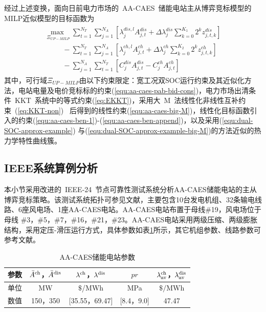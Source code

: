 经过上述变换，面向日前电力市场的~AA-CAES~储能电站主从博弈竞标模型的MILP近似模型的目标函数为
\begin{eqnarray}
\begin{array}{l}
\mathop {\max \;}\limits_{\Xi_{UP-MILP}} \sum\limits_{t = 1}^{{N_T}} {\sum\limits_{j = 1}^{{N_A}} {[{\lambda _j^{dis,l}A_{j,t}^{dis} + \Delta \lambda _j^{dis}\sum\limits_{k = 0}^{{K_1}} {{2^k}} z_{j,t,k}^{dis}}]} } \\
\;\;\;\;\;\;\;\;\; - \sum\limits_{t = 1}^{{N_T}} {\sum\limits_{j = 1}^{{N_A}} {[{\lambda _j^{ch,l}A_{j,t}^{ch} + \Delta \lambda _j^{ch}\sum\limits_{k = 0}^{{K_2}} {{2^k}} z_{j,t,k}^{ch}}]} } \\
\;\;\;\;\;\;\;\;\; - \sum\limits_{j = 1}^{{N_A}} {\sum\limits_{t = 1}^{{N_T}} {[{C_j^{dis}A_{j,t}^{dis} - C_j^{ch}A_{j,t}^{ch}}]} }
\end{array}
\end{eqnarray}
其中，可行域$\Xi_{UP-MILP}$由以下约束限定：宽工况双SOC运行约束及其近似化方法，电站电量及电价竞标标的约束(\ref{equ:aa-caes-pab-bid-cons})，电力市场出清条件~KKT~系统中的等式约束(\ref{eq:EKKT})，采用大~M~法线性化非线性互补约束~(\ref{eq:KKT-non})~ 后得到的线性约束(\ref{equ:aa-caes-big-M})，线性化目标函数引入的约束(\ref{equ:aa-caes-ben-1})-(\ref{equ:aa-caes-ben-append})，以及采用(\ref{equ:dual-SOC-approx-example}) 与(\ref{equ:dual-SOC-approx-example-big-M})的方法近似的热力学特性曲线簇。

\subsection{IEEE系统算例分析}
本小节采用改进的~IEEE-24~节点可靠性测试系统分析AA-CAES储能电站的主从博弈竞标策略。该测试系统拓扑可参见文献，主要包含10台发电机组、32条输电线路、6座风电场、1座AA-CAES电站。AA-CAES电站布置于母线\#19，风电场位于母线 \#3，\#5，\#7，\#16，\#21，\#23。AA-CAES电站采用两级压缩、两级膨胀结构，采用定压-滑压运行方式，具体参数如表\ref{tab:AA-CAES-para}所示，其它机组参数、线路参数可参考文献。%

\begin{table}[htb]
  \centering
  \begin{minipage}[t]{0.65\linewidth} %
  \caption{AA-CAES储能电站参数}
  \label{tab:AA-CAES-para}
    \begin{tabularx}{\linewidth}{ccccc}
      \toprule[1.5pt]
    参数 & $\bar A^{\rm ch}$，$\bar A^{\rm dis}$ & $\lambda^{\rm ch}$，$\lambda^{\rm dis}$ & $pr$ & $\lambda_{\rm av}^{\rm ch}$，$\lambda_{\rm av}^{\rm dis}$ \\\midrule[1pt]
  单位 & MW & $\$$/MWh & MPa & $\$/$MWh \\
  数值 & 150，350 & [35.55，69.47] & [8.4，9.0]&  47.47 \\
      \bottomrule[1.5pt]
    \end{tabularx}
  \end{minipage}
\end{table}

